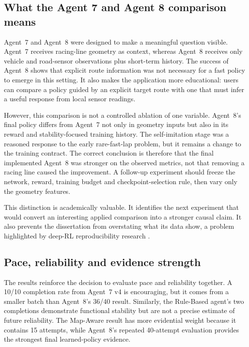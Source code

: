 \subsection{What the Agent 7 and Agent 8 comparison means}

Agent~7 and Agent~8 were designed to make a meaningful question visible. Agent~7 receives racing-line geometry as context, whereas Agent~8 receives only vehicle and road-sensor observations plus short-term history. The success of Agent~8 shows that explicit route information was not necessary for a fast policy to emerge in this setting. It also makes the application more educational: users can compare a policy guided by an explicit target route with one that must infer a useful response from local sensor readings.

However, this comparison is not a controlled ablation of one variable. Agent~8's final policy differs from Agent~7 not only in geometry inputs but also in its reward and stability-focused training history. The self-imitation stage was a reasoned response to the early rare-fast-lap problem, but it remains a change to the training contract. The correct conclusion is therefore that the final implemented Agent~8 was stronger on the observed metrics, not that removing a racing line caused the improvement. A follow-up experiment should freeze the network, reward, training budget and checkpoint-selection rule, then vary only the geometry features.

This distinction is academically valuable. It identifies the next experiment that would convert an interesting applied comparison into a stronger causal claim. It also prevents the dissertation from overstating what its data show, a problem highlighted by deep-RL reproducibility research \parencite{henderson2018,agarwal2021}.

\subsection{Pace, reliability and evidence strength}

The results reinforce the decision to evaluate pace and reliability together. A 10/10 completion rate from Agent~7 v4 is encouraging, but it comes from a smaller batch than Agent~8's 36/40 result. Similarly, the Rule-Based agent's two completions demonstrate functional stability but are not a precise estimate of future reliability. The Map-Aware result has more evidential weight because it contains 15 attempts, while Agent~8's repeated 40-attempt evaluation provides the strongest final learned-policy evidence.

